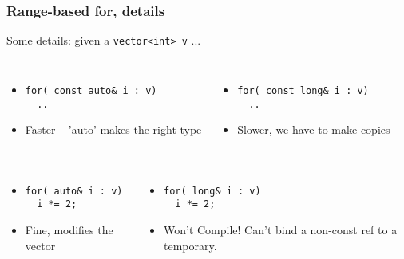 
\begin{frame}[fragile]
\frametitle{Range-based for, details}

Some details: given a \texttt{vector<int> v} ...


\begin{columns}[t]

\begin{itemize}
\item<1-> {\scriptsize \begin{verbatim}
for( const auto& i : v)
  ..
\end{verbatim}}
\item<2-> Faster -- 'auto' makes the right type
\end{itemize}

\begin{itemize}

\item  <1->{\scriptsize\begin{verbatim}
for( const long& i : v)
  ..
\end{verbatim}
}
\item<2-> Slower, we have to make copies
\end{itemize}

\end{columns}



\begin{columns}[t]

\begin{itemize}
\item<4-> {\scriptsize \begin{verbatim}
for( auto& i : v)
  i *= 2;
\end{verbatim}
}
\item<5-> Fine, modifies the vector
\end{itemize}

\begin{itemize}

\item  <4->{\scriptsize\begin{verbatim}
for( long& i : v)
  i *= 2;
\end{verbatim}
}
\item<5-> Won't Compile! Can't bind a non-const ref to a temporary.
\end{itemize}

\end{columns}
\end{frame}

